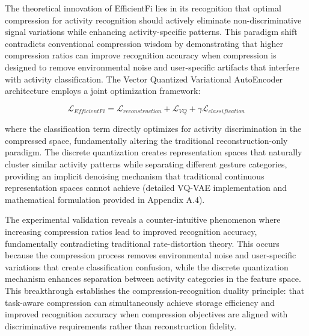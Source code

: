 \documentclass[journal]{IEEEtran}
\begin{document}
The theoretical innovation of EfficientFi lies in its recognition that optimal compression for activity recognition should actively eliminate non-discriminative signal variations while enhancing activity-specific patterns. This paradigm shift contradicts conventional compression wisdom by demonstrating that higher compression ratios can improve recognition accuracy when compression is designed to remove environmental noise and user-specific artifacts that interfere with activity classification. The Vector Quantized Variational AutoEncoder architecture employs a joint optimization framework:

$$\mathcal{L}_{EfficientFi} = \mathcal{L}_{reconstruction} + \mathcal{L}_{VQ} + \gamma \mathcal{L}_{classification}$$

where the classification term directly optimizes for activity discrimination in the compressed space, fundamentally altering the traditional reconstruction-only paradigm. The discrete quantization creates representation spaces that naturally cluster similar activity patterns while separating different gesture categories, providing an implicit denoising mechanism that traditional continuous representation spaces cannot achieve (detailed VQ-VAE implementation and mathematical formulation provided in Appendix A.4).

The experimental validation reveals a counter-intuitive phenomenon where increasing compression ratios lead to improved recognition accuracy, fundamentally contradicting traditional rate-distortion theory. This occurs because the compression process removes environmental noise and user-specific variations that create classification confusion, while the discrete quantization mechanism enhances separation between activity categories in the feature space. This breakthrough establishes the compression-recognition duality principle: that task-aware compression can simultaneously achieve storage efficiency and improved recognition accuracy when compression objectives are aligned with discriminative requirements rather than reconstruction fidelity.
\end{document}
